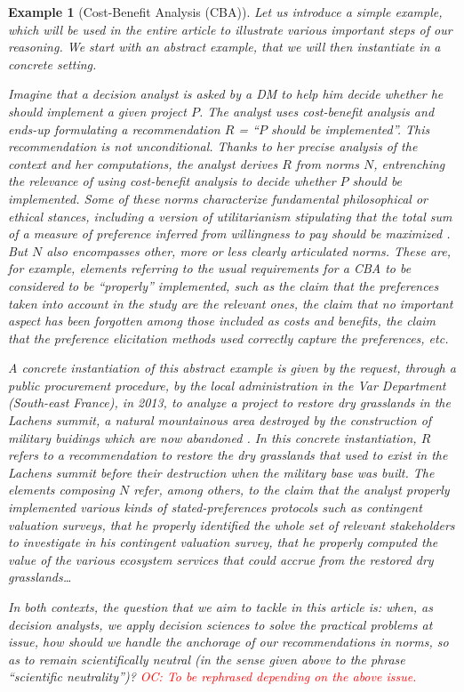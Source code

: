 \documentclass[preprint, french, english, 11pt, authoryear]{elsarticle}%
\newtheorem{example}{Example}
\newcommand{\commentOC}[1]{\textcolor{red}{OC: #1}}
\begin{document}
\begin{example}[Cost-Benefit Analysis (CBA)]
Let us introduce a simple example, which will be used in the entire article to illustrate various important steps of our reasoning. %
We start with an abstract example, that we will then instantiate in a concrete setting.

Imagine that a decision analyst is asked by a \ac{DM} to help him decide whether he should implement a given project $P$.
The analyst uses cost-benefit analysis \citep{layard_cost-benefit_1994} and ends-up formulating a recommendation $R$ = “$P$ should be implemented”.
This recommendation is not unconditional. Thanks to her precise analysis of the context and her computations, the analyst derives $R$ from norms $N$, entrenching the relevance of using cost-benefit analysis to decide whether $P$ should be implemented. Some of these norms characterize fundamental philosophical or ethical stances, including a version of utilitarianism stipulating that the total sum of a measure of preference inferred from willingness to pay should be maximized \citep{meinard_ethical_2016}. 
But $N$ also encompasses other, more or less clearly articulated norms. These are, for example, elements referring to the usual requirements for a CBA to be considered to be ``properly'' implemented, such as the claim that the preferences taken into account in the study are the relevant ones, the claim that no important aspect has been forgotten among those included as costs and benefits, the claim that the preference elicitation methods used correctly capture the preferences, etc.

A concrete instantiation of this abstract example is given by the request, through a public procurement procedure, by the local administration in the Var Department (South-east France), in 2013, to analyze a project to restore dry grasslands in the Lachens summit, a natural mountainous area destroyed by the construction of military buidings which are now abandoned \citep{meinard_etude_2015}.
In this concrete instantiation, $R$ refers to a recommendation to restore the dry grasslands that used to exist in the Lachens summit before their destruction when the military base was built. 
The elements composing $N$ refer, among others, to the claim that the analyst properly implemented various kinds of stated-preferences protocols such as contingent valuation surveys, that he properly identified the whole set of relevant stakeholders to investigate in his contingent valuation survey, that he properly computed the value of the various ecosystem services that could accrue from the restored dry grasslands…

In both contexts, the question that we aim to tackle in this article is: when, as decision analysts, we apply decision sciences to solve the practical problems at issue, how should we handle the anchorage of our recommendations in norms, so as to remain scientifically neutral (in the sense given above to the phrase ``scientific neutrality'')? \commentOC{To be rephrased depending on the above issue.}
\end{example}
\end{document}
